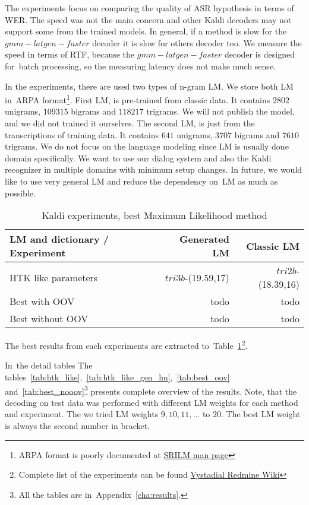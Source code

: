 The experiments focus on comparing the quality of ASR hypothesis in terms of \ac{WER}.
The speed was not the main concern and other Kaldi decoders may not support some from the trained models.
In general, if a method is slow for the $gmm-latgen-faster$ decoder it is slow for others decoder too.
We measure the speed in terms of \ac{RTF}, because the $gmm-latgen-faster$ decoder is designed for~batch 
processing, so the measuring latency does not make much sense.

In the experiments, there are used two types of n-gram \ac{LM}. 
We store both \ac{LM} in~ARPA format\footnote{ARPA format is poorly documented at 
\href{http://www.speech.sri.com/projects/srilm/manpages/ngram-format.5.html}{SRILM man page}}.
First \ac{LM}, is pre-trained from classic data. It contains $2802$ unigrams, $109315$ bigrams and
$118217$ trigrams. We will not publish the model, and we did not trained it ourselves. 
The second \ac{LM}, is just from the transcriptions of training data. It contains 
$641$ unigrams, $3707$ bigrams and $7610$ trigrams.
We do not focus on the language modeling since \ac{LM} is usually done domain specifically.
We want to use our dialog system and also the Kaldi recognizer in multiple domains with minimum
setup changes. In future, we would like to use very general \ac{LM} and reduce the dependency on~\ac{LM}
as much as possible.

\begin{table}[!htp]\label{tab:exp_type}
\begin{tabular}{lrr}
\hline
\parbox[t]{6.0cm}{\ac{LM} and dictionary / Experiment} & Generated \acs{LM}  & Classic \ac{LM} \\
\hline
\ac{HTK} like parameters    &  $tri3b$-(19.59,17) & $tri2b$-(18.39,16) \\
Best with OOV               & todo & todo \\
Best without OOV            & todo & todo \\
\hline
\end{tabular}
\caption{Kaldi experiments, best Maximum Likelihood method}
\end{table}

The best results from each experiments are extracted to~Table~\ref{tab:exp_type}\footnote{ Complete list of the experiments can be found \href{https://redmine.ms.mff.cuni.cz/projects/vystadial/wiki/Acoustic_models/}{Vystadial Redmine Wiki}}. 

In~the detail tables 
The tables~\ref{tab:htk_like},~\ref{tab:htk_like_gen_lm},~\ref{tab:best_oov} 
and~\ref{tab:best_nooov}\footnote{All the tables are in~Appendix~\ref{cha:results}.} presents complete overview of the results. 
Note, that the decoding on test data was performed with different \ac{LM} weights for each method and 
experiment. The we tried \ac{LM} weights $9, 10, 11, ...$ to $20$. 
The best \ac{LM} weight is always the second number in bracket.

